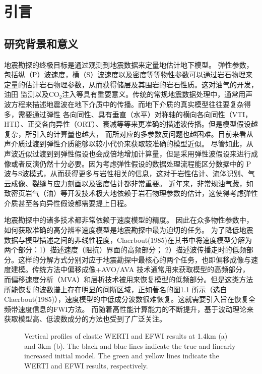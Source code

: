 \chapter{引言}
\section{研究背景和意义}
地震勘探的终极目标是通过观测到地震数据来定量地估计地下模型。
弹性参数，包括纵（P）波速度，横（S）波速度以及密度等等物性参数可以通过岩石物理来定量的估计岩石物理参数，从而获得储层及其围岩的岩石性质。这对油气的开发，油田
监测以及CO$_2$注入等具有重要意义。传统的常规地震数据处理中，通常用声波方程来描述地震波在地下介质中的传播。而地下介质的真实模型往往要复杂得多，需要通过弹性
各向同性、具有垂直（水平）对称轴的横向各向同性（VTI，HTI）、正交各向异性（ORT）、衰减等等来更准确的描述波传播。但是模型假设越复杂，所引入的计算量也越大，
而所对应的多参数反问题也越困难。目前来看从声介质过渡到弹性介质能够以较小代价来获取较准确的模型近似。
尽管如此，从声波近似过渡到到弹性假设也会成倍地增加计算量，但是采用弹性波假设来进行成像或者反演仍然十分必要。因为考虑弹性假设的数据处理流程能区分数据中的
P波与S波模式，从而获得更多与岩性相关的信息，这对于岩性估计、流体识别、气云成像、裂缝与应力刻画以及密度估计都非常重要。
近年来，非常规油气藏，如致密页岩气（油）等开发技术极大地依赖于岩石物理参数的估计，这使得考虑弹性介质甚至各向异性假设都需要提上日程。

地震勘探中的诸多技术都非常依赖于速度模型的精度。
因此在众多物性参数中，如何获取准确的高分辨率速度模型是地震勘探中最为迫切的任务。
为了降低地震数据与模型描述之间的非线性程度，Claerbout(1985)\cite{Claerbout1985Imaging}在其书中将速度模型分解为两个部分：1）描述速度（阻抗）界面的高频部分；
2）描述波传播走时的低频部分。这样的分解方式分别对应于地震勘探中最核心的两个任务，也即偏移成像与速度建模。传统方法中偏移成像+AVO/AVA
技术通常用来获取模型的高频部分，
而偏移速度分析（MVA）和层析技术被用来恢复模型的低频部分。但是这类方法所能恢复的波数谱上存在明显的间断区域，正如著名的图\ref{fig:GapInSeisVel}
所示（选自Claerbout(1985)\cite{Claerbout1985Imaging}），速度模型的中低成分波数很难恢复。这就需要引入旨在恢复全频带速度信息的FWI方法。
而随着高性能计算能力的不断提升，基于波动理论来获取模型高、低波数成分的方法也受到了广泛关注。
\begin{figure}[!htb] 
   \centering 
   \caption{Vertical profiles of elastic WERTI and EFWI results at 1.4km (a) and
       3km (b). The black and blue lines indicate the true and linearly         increased
       initial model. The green and yellow lines indicate the WERTI and EFWI    results,
       respectively.
   }
   \label{fig:GapInSeisVel}
\end{figure}

